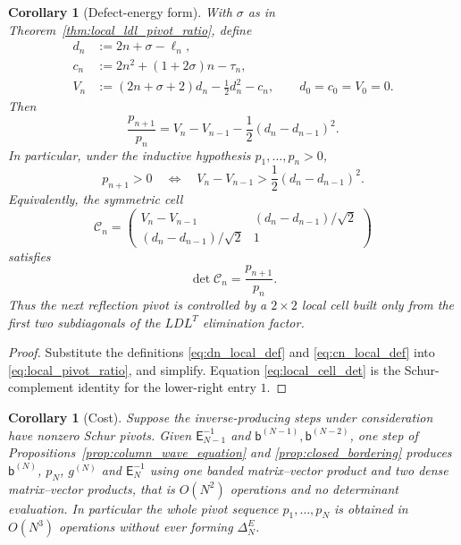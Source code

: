 \documentclass[preprint,12pt]{elsarticle}
\numberwithin{equation}{section}
\theoremstyle{plain}
\newtheorem{corollary}[theorem]{Corollary}
\theoremstyle{definition}
\theoremstyle{remark}
\newcommand{\E}{\mathsf E}
\begin{document}
\begin{corollary}[Defect-energy form]
\label{cor:defect_energy_pivot}
With $\sigma$ as in Theorem~\ref{thm:local_ldl_pivot_ratio}, define
\begin{align}
 d_n&:=2n+\sigma-\ell_n,\label{eq:dn_local_def}\\
 c_n&:=2n^2+(1+2\sigma)n-\tau_n,\label{eq:cn_local_def}\\
 V_n&:=(2n+\sigma+2)d_n-\frac12d_n^2-c_n,
 \qquad d_0=c_0=V_0=0.
 \label{eq:Vn_local_def}
\end{align}
Then
\begin{equation}
 \boxed{\;
 \frac{p_{n+1}}{p_n}
 =V_n-V_{n-1}-\frac12(d_n-d_{n-1})^2.\;}
 \label{eq:defect_energy_ratio}
\end{equation}
In particular, under the inductive hypothesis $p_1,\dots,p_n>0$,
\begin{equation}
 p_{n+1}>0
 \quad\Longleftrightarrow\quad
 V_n-V_{n-1}>\frac12(d_n-d_{n-1})^2.
 \label{eq:defect_energy_sign}
\end{equation}
Equivalently, the symmetric cell
\begin{equation}
 \mathcal C_n=
 \begin{pmatrix}
 V_n-V_{n-1} & (d_n-d_{n-1})/\sqrt2\\[2pt]
 (d_n-d_{n-1})/\sqrt2 & 1
 \end{pmatrix}
 \label{eq:local_cell_def}
\end{equation}
satisfies
\begin{equation}
 \det\mathcal C_n=\frac{p_{n+1}}{p_n}.
 \label{eq:local_cell_det}
\end{equation}
Thus the next reflection pivot is controlled by a $2\times2$ local cell built only from
the first two subdiagonals of the $LDL^T$ elimination factor.
\end{corollary}

\begin{proof}
Substitute the definitions \eqref{eq:dn_local_def} and
\eqref{eq:cn_local_def} into \eqref{eq:local_pivot_ratio}, and simplify.  Equation \eqref{eq:local_cell_det} is the
Schur-complement identity for the lower-right entry $1$.
\end{proof}

\begin{corollary}[Cost]
\label{cor:two_generator_cost}
Suppose the inverse-producing steps under consideration have nonzero Schur pivots.
Given $\E_{N-1}^{-1}$ and $\mathsf b^{(N-1)},\mathsf b^{(N-2)}$, one step of
Propositions~\ref{prop:column_wave_equation} and \ref{prop:closed_bordering} produces
$\mathsf b^{(N)}$, $p_N$, $g^{(N)}$ and $\E_N^{-1}$ using one banded matrix--vector product
and two dense matrix--vector products, that is $O(N^2)$ operations and no determinant
evaluation.  In particular the whole pivot sequence $p_1,\dots,p_N$ is obtained in
$O(N^3)$ operations without ever forming $\Delta_N^E$.
\end{corollary}
\end{document}
